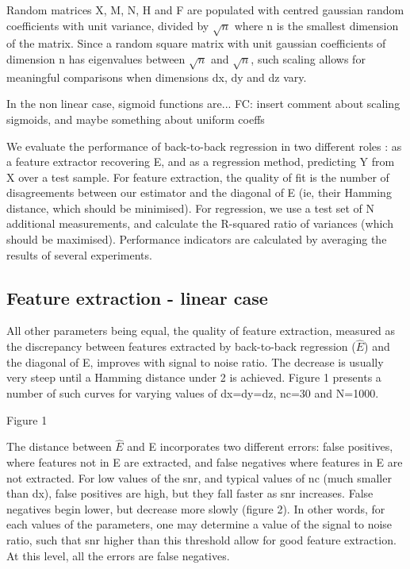 \documentclass{article}
\begin{document}
Random matrices X, M, N, H and F are populated with centred gaussian random coefficients with unit variance, divided by $ \surd n$ where n is the smallest dimension of the matrix.
%
Since a random square matrix with unit gaussian coefficients of dimension n has eigenvalues between $ \surd n $ and $\surd n $, such  scaling allows for meaningful comparisons when dimensions dx, dy and dz vary.

In the non linear case, sigmoid functions are...
FC: insert comment about scaling sigmoids, and maybe something about uniform coeffs

We evaluate the performance of back-to-back regression in two different roles : as a feature extractor recovering E, and as a regression method, predicting Y from X over a test sample.
%
For feature extraction, the quality of fit is the number of disagreements between our estimator and the diagonal of E (ie, their Hamming distance, which should be minimised).
%
For regression, we use a test set of N additional measurements, and calculate the R-squared ratio of variances (which should be maximised).
%
Performance indicators are calculated by averaging the results of several experiments.

\subsection{Feature extraction - linear case}
All other parameters being equal, the quality of feature extraction, measured as the discrepancy between features extracted by back-to-back regression ($\hat E$) and the diagonal of E, improves with signal to noise ratio.
%
The decrease is usually very steep until a Hamming distance under 2 is achieved.
%
Figure 1 presents a number of such curves for varying values of dx=dy=dz, nc=30 and N=1000.

Figure 1

The distance between $\hat E$ and E incorporates two different errors: false positives, where features not in E are extracted, and false negatives where features in E are not extracted.
%
For low values of the snr, and typical values of nc (much smaller than dx), false positives are high, but they fall faster as snr increases.
%
False negatives begin lower, but decrease more slowly (figure 2).
%
In other words, for each values of the parameters, one may determine a value of the signal to noise ratio, such that snr higher than this threshold allow for good feature extraction.
%
At this level, all the errors are false negatives.
\end{document}
